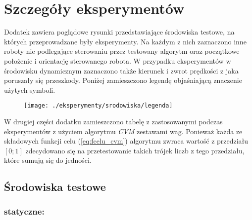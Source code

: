 \chapter[Szczegóły eksperymentów]{Szczegóły eksperymentów \label{sec:szczegoly_eksp}}
Dodatek zawiera poglądowe rysunki przedstawiające środowiska testowe, na których przeprowadzane były eksperymenty.
Na każdym z nich zaznaczono inne roboty nie podlegające sterowaniu przez testowany algorytm oraz początkowe położenie 
i orientację sterowanego robota. 
W przypadku eksperymentów w środowisku dynamicznym zaznaczono także kierunek i zwrot prędkości z jaka poruszały się przeszkody.
Poniżej zamieszczono legendę objaśniającą znaczenie użytych symboli.
	\begin{figure}[H]
	\centering
	\texttt{[image: ./eksperymenty/srodowiska/legenda]}
	\end{figure}	

W drugiej części dodatku zamieszczono tabelę z zastosowanymi podczas eksperymentów z użyciem algorytmu \textit{CVM} zestawami wag. Ponieważ każda ze składowych funkcji celu (\ref{eq:fcelu_cvm}) algorytmu  zwraca wartość z przedziału 
$[0;1]$ zdecydowano się na przetestowanie takich trójek liczb z tego przedziału,  które sumują się do jedności.
\section*{Środowiska testowe\label{sec:srodowiska_testowe}}
\subsection*{statyczne:}
	\begin{figure}[H]
	\centering	
	\hspace{0.5cm}
	    \\
	\hspace{0.5cm}
	  \\

	\end{figure}	

